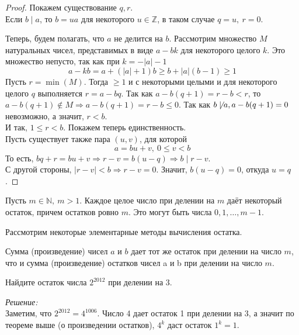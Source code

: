 \documentclass[11pt]{article}
\begin{document}
\begin{proof}

	Покажем существование $q, r$. \\


	Если $b \mid a$, то $b = ua$ для некоторого $u \in \mathbb{Z}$, в таком случае $q = u, \ r = 0$.

	Теперь, будем полагать, что $a$ не делится на $b$. Рассмотрим множество $M$ натуральных чисел, представимых в виде
	$a - bk$ для некоторого целого $k$. Это множество непусто, так как при $k = -|a| - 1$
	\[ a - kb = a + (|a| + 1)b \ge b + |a|(b - 1) \ge 1 \]
	Пусть $r = \min(M)$. Тогда $ \ge 1$ и с некоторыми целыми и для некоторого целого $q$ выполняется
	$r = a - bq$. Так как $a - b(q + 1) = r - b < r$, то $a - b(q + 1)\notin M \Rightarrow a - b(q + 1) = r - b \le 0$.
	Так как $b \not\mid a, a - b(q + 1) = 0$ невозможно, а значит, $r < b$.\\
	И так, $1 \le r < b$. Покажем теперь единственность. \\
	Пусть существует также пара $(u, v)$, для которой
	\[ a = bu + v , \ 0 \le v < b \]
	То есть, $bq + r = bu + v \Rightarrow  r - v = b(u - q) \Rightarrow b \mid r - v$.\\
	С другой стороны, $|r - v| < b \Rightarrow r - v = 0$. Значит, $b(u - q) = 0$, откуда $u = q$.

\end{proof}

\begin{corollary}

	Пусть $m \in \mathbb{N}, \ m > 1$. Каждое целое число при делении на $m$ даёт некоторый остаток, причем остатков ровно $m$.
	Это могут быть числа $0, 1, \ldots, m - 1$.

\end{corollary}

Рассмотрим некоторые элементарные методы вычисления остатка.

\begin{theorem}

	Сумма (произведение) чисел $a$ и $b$ дает тот же остаток при делении на число  $m$, что и сумма (произведение) остатков чисел a и b при делении на число $m$.

\end{theorem}

\begin{example}
	Найдите остаток числа $2^{2012}$ при делении на 3.
\end{example}
\textit{Решение:}\\
Заметим, что $2^{2012} = 4^{1006}$. Число 4  дает остаток 1 при делении на 3, а значит по теореме выше (о произведении остатков), $4^k$ даст остаток $1^k = 1$.
\end{document}
